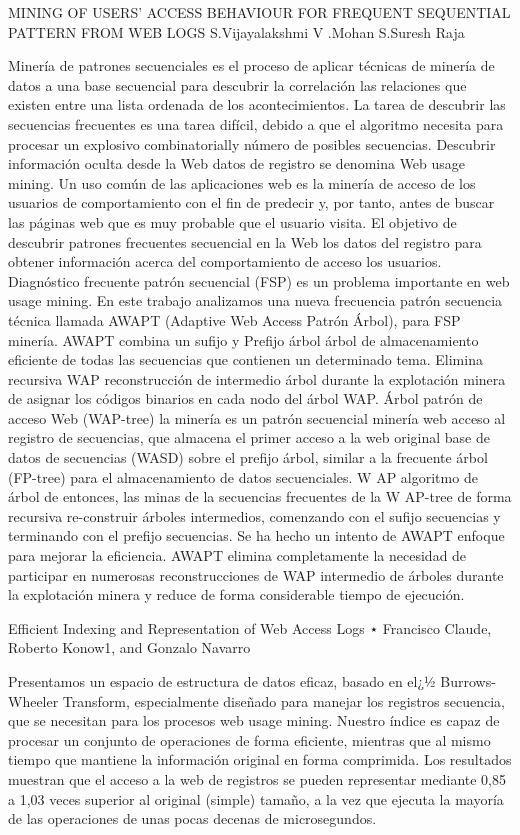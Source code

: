 MINING OF USERS’ ACCESS BEHAVIOUR FOR FREQUENT SEQUENTIAL PATTERN FROM WEB LOGS
S.Vijayalakshmi
V .Mohan
S.Suresh Raja

Minería de patrones secuenciales es el proceso de aplicar técnicas de minería de datos a una base secuencial para descubrir la correlación las relaciones que existen entre una lista ordenada de los acontecimientos. La tarea de descubrir las secuencias frecuentes es una tarea difícil, debido a que el algoritmo necesita para procesar un explosivo combinatorially número de posibles secuencias. Descubrir información oculta desde la Web datos de registro se denomina Web usage mining. Un uso común de las aplicaciones web es la minería de acceso de los usuarios de comportamiento con el fin de predecir y, por tanto, antes de buscar las páginas web que es muy probable que el usuario visita. El objetivo de descubrir patrones frecuentes secuencial en la Web los datos del registro para obtener información acerca del comportamiento de acceso los usuarios.
Diagnóstico frecuente patrón secuencial (FSP) es un problema importante en web usage mining. En este trabajo analizamos una nueva frecuencia patrón secuencia técnica llamada AWAPT (Adaptive Web Access Patrón Árbol), para FSP minería. AWAPT combina un sufijo y Prefijo árbol árbol de almacenamiento eficiente de todas las secuencias que contienen un determinado tema. Elimina recursiva WAP reconstrucción de intermedio árbol durante la explotación minera de asignar los códigos binarios en cada nodo del árbol WAP. Árbol patrón de acceso Web (WAP-tree) la minería es un patrón secuencial minería web acceso al registro de secuencias, que almacena el primer acceso a la web original base de datos de secuencias (WASD) sobre el prefijo árbol, similar a la frecuente árbol (FP-tree) para el almacenamiento de datos secuenciales. W AP algoritmo de árbol de entonces, las minas de la secuencias frecuentes de la W AP-tree de forma recursiva re-construir árboles intermedios, comenzando con el sufijo secuencias y terminando con el prefijo secuencias. Se ha hecho un intento de AWAPT enfoque para mejorar la eficiencia. AWAPT elimina completamente la necesidad de participar en numerosas reconstrucciones de WAP intermedio de árboles durante la explotación minera y reduce de forma considerable tiempo de ejecución.



Efficient Indexing and Representation of Web Access Logs ⋆
Francisco Claude, Roberto Konow1, and Gonzalo Navarro

Presentamos un espacio de estructura de datos eficaz, basado en el¿½ Burrows-Wheeler Transform, especialmente diseñado para manejar los registros secuencia, que se necesitan para los procesos web usage mining. Nuestro índice es capaz de procesar un conjunto de operaciones de forma eficiente, mientras que al mismo tiempo que mantiene la información original en forma comprimida. Los resultados muestran que el acceso a la web de registros se pueden representar mediante 0,85 a 1,03 veces superior al original (simple) tamaño, a la vez que ejecuta la mayoría de las operaciones de unas pocas decenas de microsegundos.


